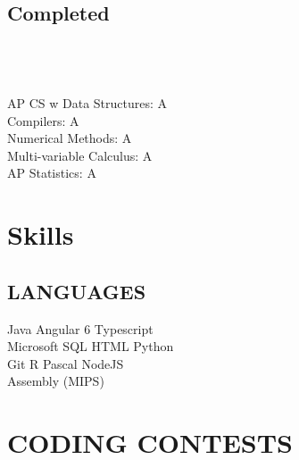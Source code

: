 \documentclass[]{deedy-resume-openfont}
\begin{document}
\begin{minipage}[t]{0.3\textwidth}
\subsection{Completed}
\\
\\
\\
\textbullet{} AP CS w Data Structures: A \\
\textbullet{} Compilers: A \\
\textbullet{} Numerical Methods: A \\
\textbullet{} Multi-variable Calculus: A \\
\textbullet{} AP Statistics: A \\
\sectionsep

\vspace{1.5cm}

\section{Skills}
\subsection{LANGUAGES}
Java \textbullet{}Angular 6 \textbullet{} Typescript \\
Microsoft SQL \textbullet{} HTML \textbullet{}Python \\
Git \textbullet{} R \textbullet{} Pascal \textbullet{} NodeJS \\  Assembly (MIPS) 

\vspace{1.5cm}
\section{CODING CONTESTS}

\sectionsep

\sectionsep



%
%

\end{minipage} 
\end{document}

